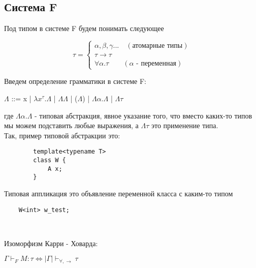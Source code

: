  	\subsection{Система F}
 	
\begin{definition}
	 	Под типом в системе F будем понимать следующее

 	
 	\begin{equation*}
 	\tau =
 	\begin{cases}
 	\alpha,\beta,\gamma ...\quad(\text{атомарные типы}) \\
 	\tau\rightarrow\tau \\
 	\forall\alpha.\tau\qquad(\alpha\text{ - переменная})
 	\end{cases}
 	\end{equation*}
 \end{definition}

 \begin{definition}
 		\large Введем определение грамматики в системе F:
 	\begin{center}
 		\large $\Lambda$ ::= x | $\lambda x^{\tau}.\Lambda$ | $\Lambda\Lambda$ | ($\Lambda$) | $\Lambda\alpha.\Lambda$ | $\Lambda\tau$ 
 	\end{center}
 \end{definition}
 	
 	где $\Lambda\alpha.\Lambda$ - типовая абстракция, явное указание того, что вместо каких-то типов мы можем подставить любые выражения, а $\Lambda\tau$ это применение типа. \\
 	
 	
 	Так, пример типовой абстракции это: 
 	\begin{verbatim}
 		template<typename T>
 		class W {
 		    A x;
 		}
 	\end{verbatim}
 	
 	Типовая аппликация это объявление переменной класса с каким-то типом
 	
 	\begin{verbatim}
 	W<int> w_test;
 	\end{verbatim}\
 	
 	\begin{theorem}
 		Изоморфизм Карри - Ховарда:
    \begin{center}
 		$\Gamma\vdash_F M:\tau\Leftrightarrow |\Gamma|\vdash_{\forall, \rightarrow}\tau$ 
    \end{center}
 	
 	\end{theorem}
 	
